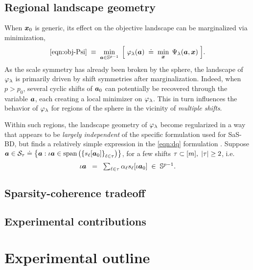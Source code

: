 \documentclass{article}
\numberwithin{equation}{section}
\begin{document}
\subsection{Regional landscape geometry}
When $\boldsymbol{x}_0$ is generic, its effect on the objective landscape can be marginalized via minimization,
\begin{equation} \label{eqn:obj-phi}
  \eqref{eqn:obj-Psi} \;\equiv\; \min_{\boldsymbol{a} \in \mathbb{S}^{p-1}} \;\Big[\;
    \varphi_\lambda(\boldsymbol{a}) \;\doteq\; \min_{\boldsymbol{x}}\; \Psi_\lambda(\boldsymbol{a}, \boldsymbol{x})
  \;\Big].
\end{equation}
As the scale symmetry has already been broken by the sphere, the landscape of $\varphi_\lambda$ is primarily driven by shift symmetries after marginalization. Indeed, when $p>p_0$, several cyclic shifts of $\boldsymbol{a}_0$ can potentially be recovered through the variable $\boldsymbol{a}$, each creating a local minimizer on $\varphi_\lambda$. This in turn influences the behavior of $\varphi_\lambda$ for regions of the sphere in the vicinity of {\em multiple shifts}.

Within such regions, the landscape geometry of $\varphi_\lambda$ become regularized in a way that appears to be {\em largely independent} of the specific formulation used for SaS-BD, but finds a relatively simple expression in the \eqref{eqn:dq} formulation \cite{kuo2019geometry}. Suppose $\boldsymbol{a} \in \mathcal{S}_\tau \doteq \left\{ \boldsymbol{a}: \iota\boldsymbol{a} \in \text{span}\left( \left\{ s_\ell[\boldsymbol{a}_0]\right\}_{\ell\in\tau}\right)\right\}$, for a few shifts $\tau\subset[m],\; \left\lvert \tau\right\rvert\geq 2$, i.e.\
\begin{equation}
  \iota\boldsymbol{a} \;\;=\;\; \textstyle \sum_{\ell\in\tau} \alpha_\ell s_\ell[\iota\boldsymbol{a}_0]
  \;\in\;\mathbb{S}^{p-1}.
\end{equation}


\subsection{Sparsity-coherence tradeoff}


\subsection{Experimental contributions}

\section{Experimental outline}

{\small


}
\end{document}
